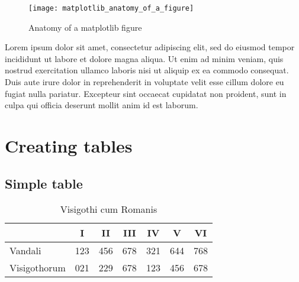 \documentclass[10pt, letterpaper, twoside]{article}
\begin{document}
\begin{figure}[H]
\texttt{[image: matplotlib\_anatomy\_of\_a\_figure]}
\caption{Anatomy of a matplotlib figure}
\end{figure}
\label{fig:anatomy_of_a_matplotlib_figure}

Lorem ipsum dolor sit amet, consectetur adipiscing elit, sed do eiusmod tempor incididunt ut labore et dolore magna aliqua. Ut enim ad minim veniam, quis nostrud exercitation ullamco laboris nisi ut aliquip ex ea commodo consequat. Duis aute irure dolor in reprehenderit in voluptate velit esse cillum dolore eu fugiat nulla pariatur. Excepteur sint occaecat cupidatat non proident, sunt in culpa qui officia deserunt mollit anim id est laborum.

\newpage
\section{Creating tables}\label{sec:tables}

\subsection{Simple table}\label{sec:simple_table}

\begin{table}[H]
\begin{flushleft}
\begin{tabular}{lcccccc}
\toprule
             & I   & II  & III & IV  & V   & VI \\
\midrule
Vandali      & 123 & 456 & 678 & 321 & 644 & 768  \\
Visigothorum & 021 & 229 & 678 & 123 & 456 & 678 \\
\bottomrule
\end{tabular}
\label{tab:visigothi_cum_romanis}
\caption{Visigothi cum Romanis}
\end{flushleft}
\end{table}
\end{document}
